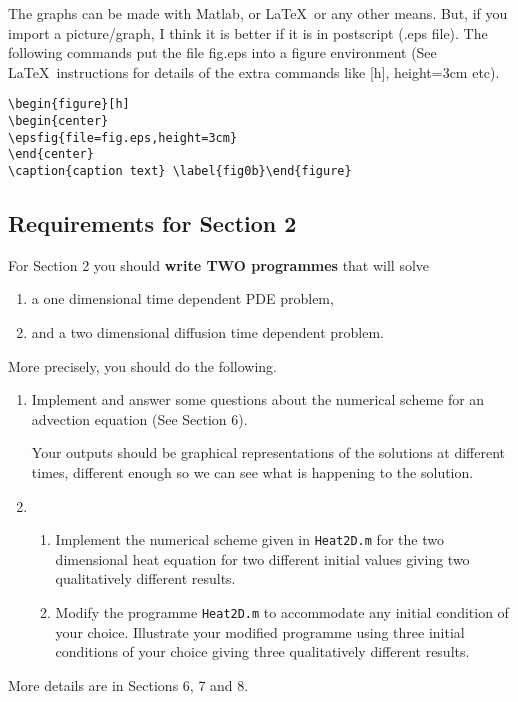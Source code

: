 \documentclass[12pt]{article}
\begin{document}
The graphs can be made with Matlab, or \LaTeX\  or any other means. But, if you import
a picture/graph, I think it is better if it is in postscript (.eps file). The following commands
put the file fig.eps into a figure environment (See \LaTeX\  instructions for details
of the extra commands like [h], height=3cm etc).

\begin{verbatim}\begin{figure}[h]
\begin{center}
\epsfig{file=fig.eps,height=3cm}
\end{center}
\caption{caption text} \label{fig0b}\end{figure}
\end{verbatim}

\newpage

\subsection{Requirements for Section 2}

For Section 2 you should {\bf\magenta write TWO programmes} that will solve
\begin{enumerate}\item a one dimensional time dependent PDE problem,
\item and a two dimensional diffusion time dependent problem. \end{enumerate}
More precisely, you should do the following.

\begin{enumerate}\item Implement and answer some questions about the numerical scheme for an advection equation (See Section 6).

Your outputs should be graphical representations of the solutions at different times, different enough so we can see what is happening to the solution.
\item\begin{enumerate}\item Implement the numerical scheme given in \verb!Heat2D.m! for the two dimensional heat equation
for two different initial values giving two qualitatively different results.
\item Modify the programme \verb!Heat2D.m! to accommodate any initial condition of your choice.
Illustrate your modified programme using three initial conditions of your choice giving three qualitatively
different results. \end{enumerate}
\end{enumerate}
More details are in Sections 6, 7 and 8.
\end{document}
